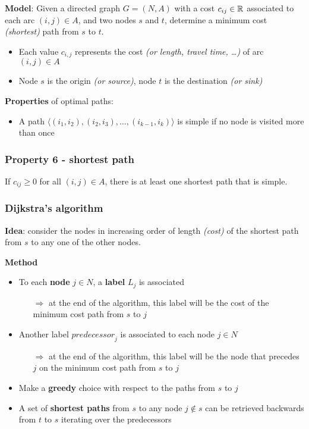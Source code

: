 \documentclass[english]{article}
\begin{document}
\bigskip
\textbf{Model}:
Given a directed graph \(G = (N, A)\) with a cost \(c_{ij} \in \mathbb{R}\) associated to each arc \((i, j) \in A\), and two nodes \(s\) and \(t\), determine a minimum cost \textit{(shortest)} path from \(s\) to \(t\).

\begin{itemize}
  \item Each value \(c_{i, j}\) represents the cost \textit{(or length, travel time, \ldots)} of arc \((i, j) \in A\)
  \item Node \(s\) is the origin \textit{(or source)}, node \(t\) is the destination \textit{(or sink)}
\end{itemize}

\bigskip
\textbf{Properties} of optimal paths:
\begin{itemize}
  \item A path \(\langle (i_1, i_2), (i_2, i_3), \ldots, (i_{k-1}, i_k)  \rangle\) is simple if no node is visited more than once
\end{itemize}

\subsubsection{Property 6 - shortest path}

If \(c_{ij} \geq 0\) for all \((i, j) \in A\), there is at least one shortest path that is simple.

\subsubsection{Dijkstra's algorithm}

\textbf{Idea}: consider the nodes in increasing order of length \textit{(cost)} of the shortest path from \(s\) to any one of the other nodes.

\bigskip
\textbf{Method}
\begin{itemize}
  \item To each \textbf{node} \(j \in N\), a \textbf{label} \(L_j\) is associated
        \begin{itemize}
          \item[\(\Rightarrow\)] at the end of the algorithm, this label will be the cost of the minimum cost path from \(s\) to \(j\)
        \end{itemize}
  \item Another label \(\textit{predecessor}_j\) is associated to each node \(j \in N\)
        \begin{itemize}
          \item[\(\Rightarrow\)] at the end of the algorithm, this label will be the node that precedes \(j\) on the minimum cost path from \(s\) to \(j\)
        \end{itemize}
  \item Make a \textbf{greedy} choice with respect to the paths from \(s\) to \(j\)
  \item A set of \textbf{shortest paths} from \(s\) to any node \(j \notin s\) can be retrieved backwards from \(t\) to \(s\) iterating over the predecessors
\end{itemize}
\end{document}
